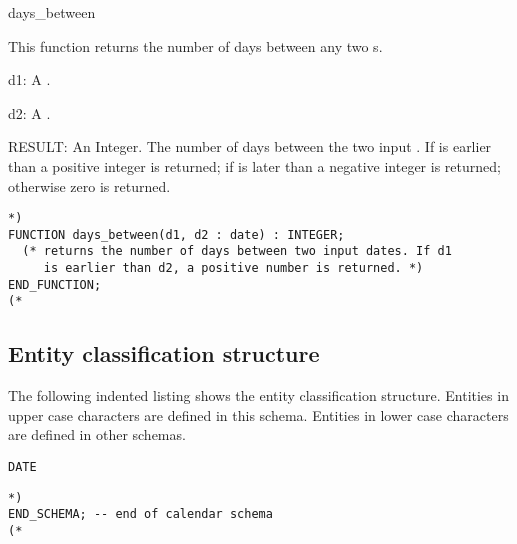 \documentclass{article}
\begin{document}
\begin{Mnamedesc}{days_between}

\begin{Mdesctext}

This function returns the number of days between any two s.

\end{Mdesctext}

\begin{Ipars}

\item[d1:] A .

\item[d2:] A .

\item[RESULT:] An Integer. The number of days between the two input
. If  is earlier than  a positive integer is
returned; if  is later than  a negative integer is returned;
otherwise zero is returned.

\end{Ipars}

\begin{Mexp}
\begin{verbatim}
*)
FUNCTION days_between(d1, d2 : date) : INTEGER;
  (* returns the number of days between two input dates. If d1
     is earlier than d2, a positive number is returned. *)
END_FUNCTION;
(*
\end{verbatim}
\end{Mexp}
\end{Mnamedesc}

\subsection{Entity classification structure}

The following indented listing shows the entity classification structure.
Entities in upper case characters are defined in this schema. Entities in
lower case characters are defined in other schemas.

\begin{small}
\begin{verbatim}
DATE
\end{verbatim}
\end{small}

\begin{small}
\begin{verbatim}
*)
END_SCHEMA; -- end of calendar schema
(*
\end{verbatim}
\end{small}
\end{document}
